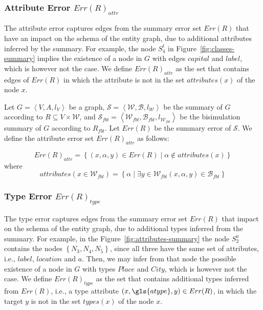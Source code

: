 \subsubsection{Attribute Error $Err(R)_{attr}$}

The attribute error captures edges from the summary error set $Err(R)$ that have an impact on the schema of the entity graph, due to additional attributes inferred by the summary. For example, the node $S^t_4$ in Figure~\ref{fig:classes-summary} implies the existence of a node in $G$ with edges $capital$ and $label$, which is however not the case. We define $Err(R)_{attr}$ as the set that contains edges of $Err(R)$ in which the attribute is not in the set $attributes(x)$ of the node $x$.

\begin{definition}
	Let $G=\left\langle V, A, l_V \right\rangle$ be a graph, $\mathcal{S} = \left\langle \mathcal{W}, \mathcal{B}, l_{\mathcal{W}} \right\rangle$ be the summary of $G$ according to $R \subseteq V \times \mathcal{W}$, and $\mathcal{S}_{fbt} = \left\langle \mathcal{W}_{fbt}, \mathcal{B}_{fbt}, l_{\mathcal{W}_{fbt}} \right\rangle$ be the bisimulation summary of $G$ according to $R_{fbt}$. Let $Err(R)$ be the summary error of $\mathcal{S}$. We define the attribute error set $Err(R)_{attr}$ as follows:

	$$
	Err(R)_{attr} = \left\lbrace (x, \alpha, y) \in Err(R) \mid \alpha \not \in attributes(x) \right\rbrace
	$$
	where
	$$
	attributes(x \in \mathcal{W}_{fbt}) = \left\lbrace \alpha \mid \exists y \in \mathcal{W}_{fbt} (x, \alpha, y) \in \mathcal{B}_{fbt} \right\rbrace
	$$
\end{definition}

\subsubsection{Type Error $Err(R)_{type}$}

The type error captures edges from the summary error set $Err(R)$ that impact on the schema of the entity graph, due to additional types inferred from the summary.
For example, in the Figure~\ref{fig:attributes-summary} the node $S^a_2$ contains the nodes $\left\lbrace N_3, N_4, N_5 \right\rbrace$, since all three have the same set of attributes, i.e., $label$, $location$ and $a$. Then, we may infer from that node the possible existence of a node in $G$ with types $Place$ and $City$, which is however not the case. We define $Err(R)_{type}$ as the set that contains additional types inferred from $Err(R)$, i.e., a type attribute $(x, \gls{atype}, y) \in Err(R)$, in which the target $y$ is not in the set $types(x)$ of the node $x$.

